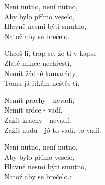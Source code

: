 
\ve{}
Není nutno, není nutno,\\
Aby bylo přímo veselo,\\
Hlavně nesmí býti smutno,\\
Natož aby se brečelo.

\ve{}
Chceš-li, trap se, že ti v kapse\\
Zlaté mince nechřestí,\\
Nemít žádné kamarády,\\
Tomu já říkám neštěs tí.

\re{*}
Nemít prachy - nevadí,\\
Nemít srdce - vadí,\\
Zažít krachy - nevadí,\\
Zažít nudu - jó to vadí, to vadí.

\ve{}
\:Není nutno, není nutno,\\
Aby bylo přímo veselo,\\
Hlavně nesmí býti smutno,\\
Natož aby se brečelo.:\

\esong